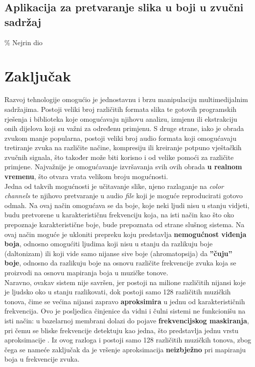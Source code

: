 \documentclass[12pt,a4paper]{article}
\begin{document}
\subsection{Aplikacija za pretvaranje slika u boji u zvučni sadržaj}

\% Nejrin dio

\newpage

\section{Zaključak}

Razvoj tehnologije omogućio je jednostavnu i brzu manipulaciju multimedijalnim sadržajima. Postoji veliki broj različitih formata slika te gotovih programskih rješenja i biblioteka koje omogućavaju njihovu analizu, izmjenu ili ekstrakciju onih dijelova koji su važni za određenu primjenu. S druge strane, iako je obrada zvukom manje popularna, postoji veliki broj audio formata koji omogućavaju tretiranje zvuka na različite načine, kompresiju ili kreiranje potpuno vještačkih zvučnih signala, što također može biti korisno i od velike pomoći za različite primjene. Najvažnije je omogućavanje izvršavanja svih ovih obrada \textbf{u realnom vremenu}, što otvara vrata velikom broju mogućnosti. \\

Jedna od takvih mogućnosti je učitavanje slike, njeno razlaganje na \textit{color channels} te njihovo pretvaranje u audio \textit{file} koji je moguće reproducirati gotovo odmah. Na ovaj način omogućava se da boje, koje neki ljudi nisu u stanju vidjeti, budu pretvorene u karakterističnu frekvenciju koja, na isti način kao što oko prepoznaje karakteristične boje, bude prepoznata od strane slušnog sistema. Na ovaj način moguće je ukloniti prepreku koju predstavlja \textbf{nemogućnost viđenja boja}, odnosno omogućiti ljudima koji nisu u stanju da razlikuju boje (daltonizam) ili koji vide samo nijanse sive boje (ahromatopsija) da \textbf{''čuju'' boje}, odnosno da razlikuju boje na osnovu različite frekvencije zvuka koja se proizvodi na osnovu mapiranja boja u muzičke tonove. \\

Naravno, ovakav sistem nije savršen, jer postoji na milione različitih nijansi koje je ljudsko oko u stanju razlikovati, dok postoji samo 128 različitih muzičkih tonova, čime se većina nijansi zapravo \textbf{aproksimira} u jednu od karakterističnih frekvencija. Ovo je posljedica činjenice da vidni i čulni sistemi ne funkcionišu na isti način: u bazelarnoj membrani dolazi do pojave \textbf{frekvencijskog maskiranja}, pri čemu se bliske frekvencije detektuju kao jedna, što predstavlja jednu vrstu aproksimacije \cite{shupi}. Iz ovog razloga i postoji samo 128 različitih muzičkih tonova, zbog čega se nameće zaključak da je vršenje aproksimacija \textbf{neizbježno} pri mapiranju boja u frekvencije zvuka. \\
\end{document}

